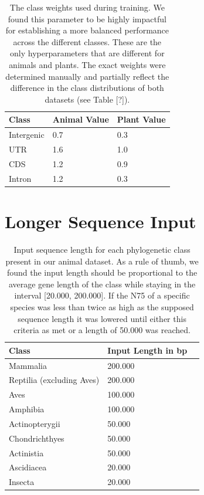 \documentclass{article}
\begin{document}
\begin{table}[!h]
\renewcommand\thetable{S1}
\centering
\begin{tabular}{@{}lll@{}}
\hline
Class & Animal Value & Plant Value \\ [0.5ex]
\hline
Intergenic & 0.7 & 0.3 \\
UTR & 1.6 & 1.0 \\
CDS & 1.2 & 0.9 \\
Intron & 1.2 & 0.3 \\
\hline
\end{tabular}
\caption{The class weights used during training. We found this parameter to be highly impactful for establishing a more balanced performance across the different classes. These are the only hyperparameters that are different for animals and plants. The exact weights were determined manually and partially reflect the difference in the class distributions of both datasets (see Table [?]).}
\end{table}


\newpage
\section{Longer Sequence Input}
\label{sec:longer}
\begin{table}[!h]
\renewcommand\thetable{S1}
\centering
\begin{tabular}{@{}lll@{}}
\hline
Class & Input Length in bp\\ [0.5ex]
\hline
Mammalia & 200.000 \\
Reptilia (excluding Aves) & 200.000 \\
Aves & 100.000 \\
Amphibia & 100.000 \\
Actinopterygii & 50.000 \\
Chondrichthyes & 50.000 \\
Actinistia & 50.000 \\
Ascidiacea & 20.000 \\
Insecta & 20.000 \\
\hline
\end{tabular}
\caption{Input sequence length for each phylogenetic class present in our animal dataset. As a rule of thumb, we found the input length should be proportional to the average gene length of the class while staying in the interval [20.000, 200.000]. If the N75 of a specific species was less than twice as high as the supposed sequence length it was lowered until either this criteria as met or a length of 50.000 was reached. }
\end{table}
\end{document}
